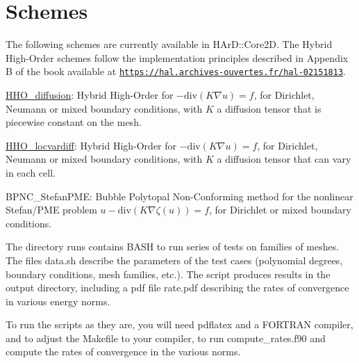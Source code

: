 \label{_schemes}%
 \hypertarget{index_schemes}{}\section{Schemes}\label{index_schemes}
The following schemes are currently available in H\+Ar\+D\+::\+Core2D. The Hybrid High-\/\+Order schemes follow the implementation principles described in Appendix B of the book available at \href{https://hal.archives-ouvertes.fr/hal-02151813}{\tt https\+://hal.\+archives-\/ouvertes.\+fr/hal-\/02151813}.


\begin{DoxyItemize}
\item \hyperlink{classHArDCore2D_1_1HHO__Diffusion}{H\+H\+O\+\_\+diffusion}\+: Hybrid High-\/\+Order for $-\mathrm{div}(K\nabla u)=f$, for Dirichlet, Neumann or mixed boundary conditions, with $K$ a diffusion tensor that is piecewise constant on the mesh.
\item \hyperlink{classHArDCore2D_1_1HHO__LocVarDiff}{H\+H\+O\+\_\+locvardiff}\+: Hybrid High-\/\+Order for $-\mathrm{div}(K\nabla u)=f$, for Dirichlet, Neumann or mixed boundary conditions, with $K$ a diffusion tensor that can vary in each cell.
\item B\+P\+N\+C\+\_\+\+Stefan\+P\+ME\+: Bubble Polytopal Non-\/\+Conforming method for the nonlinear Stefan/\+P\+ME problem $u-\mathrm{div}(K\nabla \zeta(u))=f$, for Dirichlet or mixed boundary conditions.
\end{DoxyItemize}

The directory {\ttfamily runs} contains B\+A\+SH to run series of tests on families of meshes. The files {\ttfamily data.\+sh} describe the parameters of the test cases (polynomial degrees, boundary conditions, mesh families, etc.). The script produces results in the {\ttfamily output} directory, including a pdf file {\ttfamily rate.\+pdf} describing the rates of convergence in various energy norms.

To run the scripts as they are, you will need {\ttfamily pdflatex} and a F\+O\+R\+T\+R\+AN compiler, and to adjust the {\ttfamily Makefile} to your compiler, to run {\ttfamily compute\+\_\+rates.\+f90} and compute the rates of convergence in the various norms. 